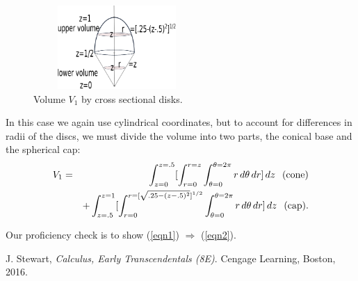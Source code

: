 \documentclass[12pt,fleqn]{article}
\begin{document}
\begin{figure}[h]
    \centering
        \includegraphics [width=2.5in, height=1.25in]{ic4.eps}
    \caption{Volume $V_1$ by cross sectional disks.}
    \label{ic4}
\end{figure}

{\flushleft In} this case we again use cylindrical coordinates, but to account for differences in radii of the discs, we must divide the volume into two parts, the conical base  and the spherical cap:
\begin{eqnarray}
V_1 & = & \int_{z=0}^{z=.5}[\int_{r=0}^{r=z}\int_{\theta=0}^{\theta=2\pi} r\,d\theta\,dr]\,dz \hspace{.1in} \textup{(cone)}\nonumber\\
&& + \int_{z=.5}^{z=1}[\int_{r=0}^{r=[\sqrt{.25-(z-.5)^2}]^{1/2}}\int_{\theta=0}^{\theta=2\pi} r\,d\theta\,dr]\,dz \hspace{.1in} \textup{(cap)}.\label{eqn2}
\end{eqnarray}


{\flushleft Our} proficiency check is to show (\ref{eqn1}) $\Rightarrow$ (\ref{eqn2}).





\begin{thebibliography}{5}

 J. Stewart,  \emph{Calculus, Early Transcendentals (8E)}. Cengage Learning, Boston, 2016.

\end{thebibliography}
\end{document}

